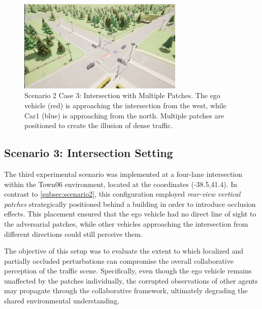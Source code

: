 \begin{figure}[H]
    \centering
    \includegraphics[width=0.7\textwidth]{figures/experiments/scenario2_v3.png}
    \caption{Scenario 2 Case 3: Intersection with Multiple Patches. The ego vehicle (red) is approaching the intersection from the west, while Car1 (blue) is approaching from the north. Multiple patches are positioned to create the illusion of dense traffic.}
    \label{fig:scenario_intersection_case3}
\end{figure}

\subsection{Scenario 3: Intersection Setting}
\label{subsec:scenario3}

The third experimental scenario was implemented at a four-lane intersection within 
the Town06 environment, located at the coordinates (-38.5,41.4). In contrast to \ref{subsec:scenario2},
this configuration employed \textit{rear-view vertical patches} strategically positioned behind a building in order to introduce 
occlusion effects. This placement ensured that the ego vehicle had no direct line of sight 
to the adversarial patches, while other vehicles approaching the intersection from 
different directions could still perceive them.  

The objective of this setup was to evaluate the extent to which localized and 
partially occluded perturbations can compromise the overall collaborative perception 
of the traffic scene. Specifically, even though the ego vehicle remains unaffected 
by the patches individually, the corrupted observations of other agents may 
propagate through the collaborative framework, ultimately degrading the shared 
environmental understanding.  

